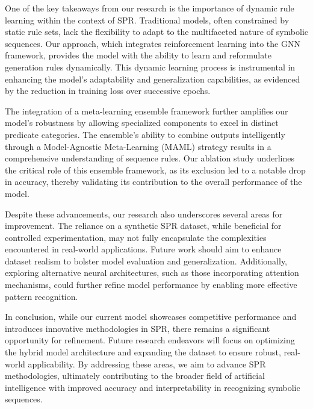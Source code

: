 \documentclass{article}
\begin{document}
One of the key takeaways from our research is the importance of dynamic rule learning within the context of SPR. Traditional models, often constrained by static rule sets, lack the flexibility to adapt to the multifaceted nature of symbolic sequences. Our approach, which integrates reinforcement learning into the GNN framework, provides the model with the ability to learn and reformulate generation rules dynamically. This dynamic learning process is instrumental in enhancing the model's adaptability and generalization capabilities, as evidenced by the reduction in training loss over successive epochs.

The integration of a meta-learning ensemble framework further amplifies our model's robustness by allowing specialized components to excel in distinct predicate categories. The ensemble's ability to combine outputs intelligently through a Model-Agnostic Meta-Learning (MAML) strategy results in a comprehensive understanding of sequence rules. Our ablation study underlines the critical role of this ensemble framework, as its exclusion led to a notable drop in accuracy, thereby validating its contribution to the overall performance of the model.

Despite these advancements, our research also underscores several areas for improvement. The reliance on a synthetic SPR dataset, while beneficial for controlled experimentation, may not fully encapsulate the complexities encountered in real-world applications. Future work should aim to enhance dataset realism to bolster model evaluation and generalization. Additionally, exploring alternative neural architectures, such as those incorporating attention mechanisms, could further refine model performance by enabling more effective pattern recognition.

In conclusion, while our current model showcases competitive performance and introduces innovative methodologies in SPR, there remains a significant opportunity for refinement. Future research endeavors will focus on optimizing the hybrid model architecture and expanding the dataset to ensure robust, real-world applicability. By addressing these areas, we aim to advance SPR methodologies, ultimately contributing to the broader field of artificial intelligence with improved accuracy and interpretability in recognizing symbolic sequences.
\end{document}
